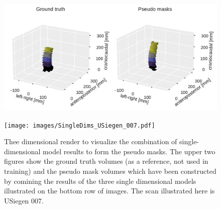 \begin{figure}
    \centering
    \centering
    \begin{minipage}{.99\textwidth}
        \includegraphics[width=.99\textwidth]{images/GroundTruth_morphComb_USiegen_007.pdf}
    \end{minipage} 
    \vspace{1 mm}
    \begin{minipage}{.99\textwidth}
        \texttt{[image: images/SingleDims\_USiegen\_007.pdf]}
    \end{minipage} 
    \vspace{2 mm}
    \caption{Thee dimensional render to visualize the combination of single-dimensional model results to form the pseudo masks.
    The upper two figures show the ground truth volumes (as a reference, not used in training) and the pseudo mask volumes which have been constructed by comining the results of the three single dimensional models illustrated on the bottom row of images.
    The scan illustrated here is USiegen 007.
    \protect}
\end{figure}

